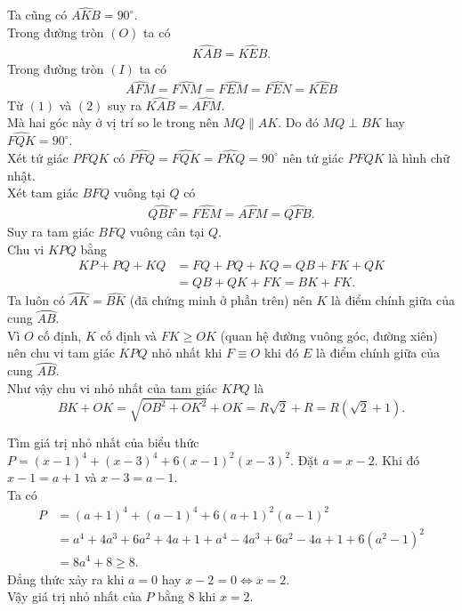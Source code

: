 \begin{ex}
{\begin{enumerate}
   Ta cũng có $\widehat{AKB} = 90^\circ$.\\
   Trong đường tròn $(O)$ ta có
   \begin{align*}
    \widehat{KAB} = \widehat{KEB}. \tag{1}
   \end{align*}
   Trong đường tròn $(I)$ ta có
   \begin{align*}
    \widehat{AFM} = \widehat{FNM} = \widehat{FEM} = \widehat{FEN} = \widehat{KEB} \tag{2} 
   \end{align*}
   Từ $(1)$ và $(2)$ suy ra $\widehat{KAB} = \widehat{AFM}$.\\
   Mà hai góc này ở vị trí so le trong nên $MQ \parallel AK$. Do đó $MQ \perp BK$ hay $\widehat{FQK} = 90^\circ$.\\
   Xét tứ giác $PFQK$ có $\widehat{PFQ} = \widehat{FQK} = \widehat{PKQ} = 90^\circ$ nên tứ giác $PFQK$ là hình chữ nhật.\\
   Xét tam giác $BFQ$ vuông tại $Q$ có
   \begin{align*}
    \widehat{QBF} = \widehat{FEM} = \widehat{AFM} = \widehat{QFB}.
   \end{align*}
   Suy ra tam giác $BFQ$ vuông cân tại $Q$.\\
   Chu vi $KPQ$ bằng 
   \begin{align*}
    KP + PQ + KQ & = FQ + PQ + KQ = QB + FK + QK\\
    			 & = QB + QK + FK = BK + FK.
   \end{align*}
   Ta luôn có $\wideparen{AK} = \widehat{BK}$ (đã chứng minh ở phần trên) nên $K$ là điểm chính giữa của cung $\wideparen{AB}$.\\
   Vì $O$ cố định, $K$ cố định và $FK \geq OK$ (quan hệ đường vuông góc, đường xiên) nên chu vi tam giác $KPQ$ nhỏ nhất khi $F \equiv O$ khi đó $E$ là điểm chính giữa của cung $\wideparen{AB}$.\\
   Như vậy chu vi nhỏ nhất của tam giác $KPQ$ là
   $$BK + OK = \sqrt{OB^2 + OK^2} + OK = R\sqrt{2} + R = R \left(\sqrt{2} + 1\right).$$
  \end{enumerate}
  }
\end{ex}  


\begin{ex}%
 Tìm giá trị nhỏ nhất của biểu thức $P = (x-1)^4 + (x-3)^4 + 6(x-1)^2(x-3)^2$.
 \loigiai
  {
  Đặt $a = x - 2$. Khi đó $x - 1 = a + 1$ và $x - 3 = a - 1$.\\
  Ta có
  \begin{align*}
   P & = (a+1)^4 + (a-1)^4 + 6(a+1)^2(a-1)^2\\
     & = a^4 + 4a^3 + 6a^2 + 4a + 1 + a^4 - 4a^3 + 6a^2 - 4a + 1 + 6(a^2 - 1)^2\\
     & = 8a^4 + 8 \geq 8.
  \end{align*}
  Đẳng thức xảy ra khi $a = 0$ hay $x - 2 = 0 \Leftrightarrow x = 2$.\\
  Vậy giá trị nhỏ nhất của $P$ bằng $8$ khi $x = 2$.
  }
\end{ex}

